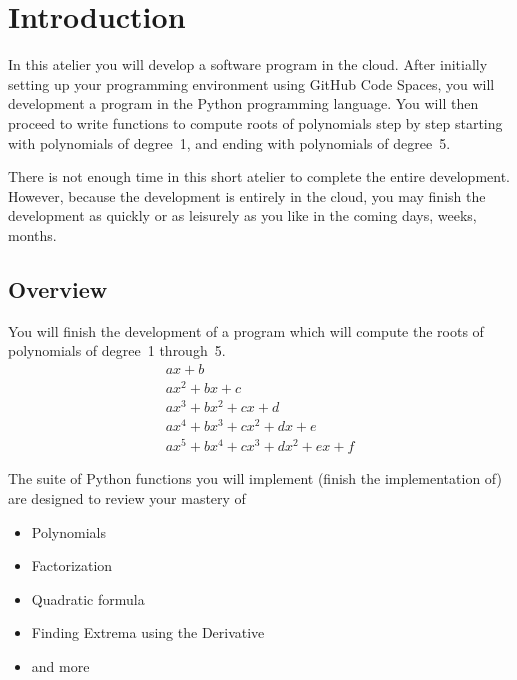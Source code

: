 \section{Introduction}
\label{sec.intro}

In this atelier you will develop a software program in the cloud.  After
initially setting up your programming environment using GitHub Code Spaces, you
will development a  program in the
Python programming language.  You will then proceed to write functions
to compute roots of polynomials step by step starting with polynomials
of degree~1, and ending with polynomials of degree~5.

There is not enough time in this short atelier to complete the entire
development.  However, because the development is entirely in the
cloud, you may finish the development as quickly or as leisurely as
you like in the coming days, weeks, months.

\subsection{Overview}

You will finish the development of a program which will compute the
roots of polynomials of degree~1 through~5.
\begin{align*}
  a x + b\\
  a x^2 + b x + c\\
  a x^3 + b x^2 + c x + d\\
  a x^4 + b x^3 + c x^2 + d x + e\\
  a x^5 + b x^4 + c x^3 + d x^2 + e x + f
\end{align*}

The suite of Python functions you will implement (finish the
implementation of) are designed to review your mastery of
\begin{itemize}
\item Polynomials
\item Factorization
\item Quadratic formula
\item Finding Extrema using the Derivative
\item and more
\end{itemize}

